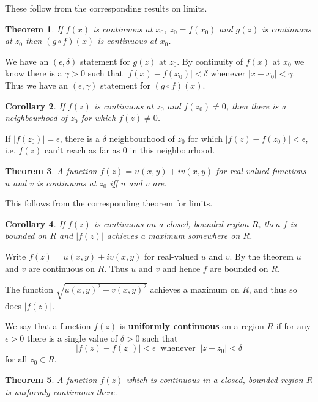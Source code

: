 \documentclass[a4paper,10pt]{article}
\newtheorem{theorem}{Theorem}[section]
\newtheorem{corollary}[theorem]{Corollary}
\newenvironment{definition}[1][Definition]{\begin{trivlist}
\item[\hskip \labelsep {\bfseries #1}]}{\end{trivlist}}
\begin{document}
These follow from the corresponding results on limits.

\begin{theorem}
If $f(x)$ is continuous at $x_0$, $z_0 = f(x_0)$ and $g(z)$ is continuous at $z_0$ then $(g\circ f)(x)$ is continuous at $x_0$.
\end{theorem}

We have an $(\epsilon, \delta)$ statement for $g(z)$ at $z_0$. By continuity of $f(x)$ at $x_0$ we know there is a $\gamma > 0$ such that $|f(x) - f(x_0)| < \delta$ whenever $|x - x_0| < \gamma$. Thus we have an $(\epsilon, \gamma)$ statement for $(g\circ f)(x)$.

\begin{corollary}
If $f(z)$ is continuous at $z_0$ and $f(z_0) \neq 0$, then there is a neighbourhood of $z_0$ for which $f(z) \neq 0$.
\end{corollary}

If $|f(z_0)| = \epsilon$, there is a $\delta$ neighbourhood of $z_0$ for which $|f(z) - f(z_0)| < \epsilon$, i.e. $f(z)$ can't reach as far as $0$ in this neighbourhood.

\begin{theorem}
A function $f(z) = u(x, y) + iv(x, y)$ for real-valued functions $u$ and $v$ is continuous at $z_0$ iff $u$ and $v$ are.
\end{theorem}

This follows from the corresponding theorem for limits.

\begin{corollary}
If $f(z)$ is continuous on a closed, bounded region $R$, then $f$ is bounded on $R$ and $|f(z)|$ achieves a maximum somewhere on $R$.
\end{corollary}

Write $f(z) = u(x, y) + iv(x, y)$ for real-valued $u$ and $v$. By the theorem $u$ and $v$ are continuous on $R$. Thus $u$ and $v$ and hence $f$ are bounded on $R$.

The function $\sqrt{u(x, y)^2 + v(x, y)^2}$ achieves a maximum on $R$, and thus so does $|f(z)|$.

\begin{definition}
We say that a function $f(z)$ is \textbf{uniformly continuous} on a region $R$ if for any $\epsilon > 0$ there is a single value of $\delta > 0$ such that
$$|f(z) - f(z_0)| < \epsilon \;\;\mbox{whenever}\;\; |z - z_0| < \delta$$
for all $z_0 \in R$.
\end{definition}

\begin{theorem}
A function $f(z)$ which is continuous in a closed, bounded region $R$ is uniformly continuous there.
\end{theorem}
\end{document}
